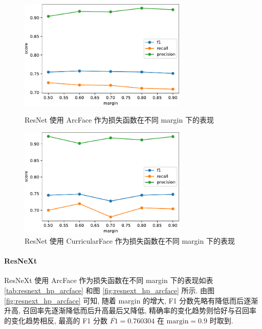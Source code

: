 \documentclass[12pt]{article}
\begin{document}
\begin{figure}[htbp]
  \centering
  \begin{minipage}[t]{0.48\textwidth}
    \centering
    \includegraphics[width=8cm]{resnet_hp_arcface.pdf}
    \caption{ResNet 使用 ArcFace 作为损失函数在不同 margin 下的表现}
    \label{fig:resnet_hp_arcface}
  \end{minipage}
  \begin{minipage}[t]{0.48\textwidth}
    \centering
    \includegraphics[width=8cm]{resnet_hp_curface.pdf}
    \caption{ResNet 使用 CurricularFace 作为损失函数在不同 margin 下的表现}
    \label{fig:resnet_hp_curface}
  \end{minipage}
\end{figure}

\paragraph{ResNeXt}

ResNeXt 使用 ArcFace 作为损失函数在不同 margin 下的表现如表 \ref{tab:resnext_hp_arcface} 和图 \ref{fig:resnext_hp_arcface} 所示. 由图 \ref{fig:resnext_hp_arcface} 可知, 随着 margin 的增大, F1 分数先略有降低而后逐渐升高, 召回率先逐渐降低而后升高最后又降低, 精确率的变化趋势则恰好与召回率的变化趋势相反, 最高的 F1 分数 $\overline{F1}=0.760304$ 在 $\text{margin} = 0.9$ 时取到.
\end{document}
